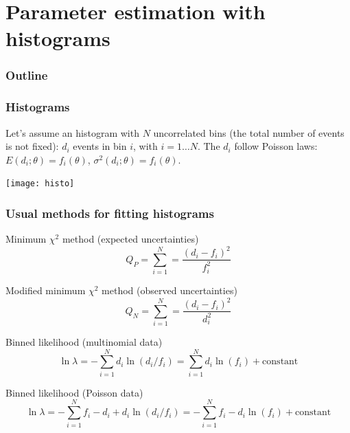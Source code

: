 \documentclass[9pt]{beamer}
\newif\ifmyhide
\newcommand\myhide[1]{%
\ifmyhide \vspace{15pt} \begin{center} \myexample{(blackboard)}\end{center} \vspace{15pt} \else #1 \fi
}
\begin{document}
\section{Parameter estimation with histograms}

\begin{frame}
 \frametitle{Outline}
 
 \tableofcontents[current]
\end{frame}

\begin{frame}
 \frametitle{Histograms}
 
 Let's assume an histogram with $N$ uncorrelated bins (the total number of events is not fixed): $d_i$ events in bin $i$, with $i = 1 \dots N$. The $d_i$ follow Poisson laws: $E(d_i;\theta) = f_i(\theta)$,
 $\sigma^2(d_i;\theta) = f_i(\theta)$.
 
 \vspace{10pt}
 
 \begin{center}
  \texttt{[image: histo]}
 \end{center}

\end{frame}


\begin{frame}
 \frametitle{Usual methods for fitting histograms}
 
 \myhide{
 \begin{block}{Minimum $\chi^2$ method (expected uncertainties)} 
 \vspace{-7pt}
  $$Q_P = \sum_{i=1}^N = \frac{\left(d_i - f_i\right)^2}{f_i^2}$$
  \vspace{-7pt}
 \end{block}
 
 \begin{block}{Modified minimum $\chi^2$ method (observed uncertainties)} 
 \vspace{-7pt}
  $$Q_N = \sum_{i=1}^N = \frac{\left(d_i - f_i\right)^2}{d_i^2}$$
  \vspace{-7pt}
 \end{block}
 
 \begin{block}{Binned likelihood (multinomial data)}
 \vspace{-7pt}
  $$\ln \lambda = - \sum_{i=1}^N d_i \ln (d_i/f_i) = \sum_{i=1}^N d_i \ln (f_i) + \text{constant}$$
  \vspace{-7pt}
 \end{block}

\begin{block}{Binned likelihood (Poisson data)}
\vspace{-7pt}
  $$\ln \lambda = - \sum_{i=1}^N f_i - d_i + d_i \ln (d_i/f_i) = - \sum_{i=1}^N f_i - d_i \ln (f_i) + \text{constant}$$
  \vspace{-7pt}
 \end{block}}

\end{frame}
\end{document}
